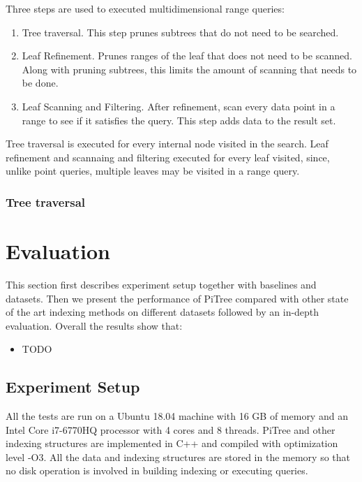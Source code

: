 \documentclass[sigconf,10pt]{acmart}
\begin{document}
Three steps are used to executed multidimensional range queries:
\begin{enumerate}
  \item Tree traversal. This step prunes subtrees that do not need to be searched.
  \item Leaf Refinement. Prunes ranges of the leaf that does not need to be scanned.
  Along with pruning subtrees, this limits the amount of scanning that needs to be done.
  \item Leaf Scanning and Filtering. After refinement, scan every data point in
  a range to see if it satisfies the query. This step adds 
  data to the result set.
\end{enumerate}

Tree traversal is executed for every internal node visited in the search.
Leaf refinement and scannaing and filtering executed for every leaf visited, since, unlike
point queries, multiple leaves may be visited in a range query.

\subsubsection{Tree traversal}

\section{Evaluation}

This section first describes experiment setup together with baselines and datasets. 
Then we present the performance of PiTree compared with other state of the art 
indexing methods on different datasets followed by an in-depth evaluation. 
Overall the results show that:
\begin{itemize}
    \item TODO
\end{itemize}

\subsection{Experiment Setup}

All the tests are run on a Ubuntu 18.04 machine with 16 GB of memory and an Intel 
Core i7-6770HQ processor with 4 cores and 8 threads. PiTree and other indexing 
structures are implemented in C++ and compiled with optimization level -O3. 
All the data and indexing structures are stored in the memory so that no disk 
operation is involved in building indexing or executing queries.
\end{document}
